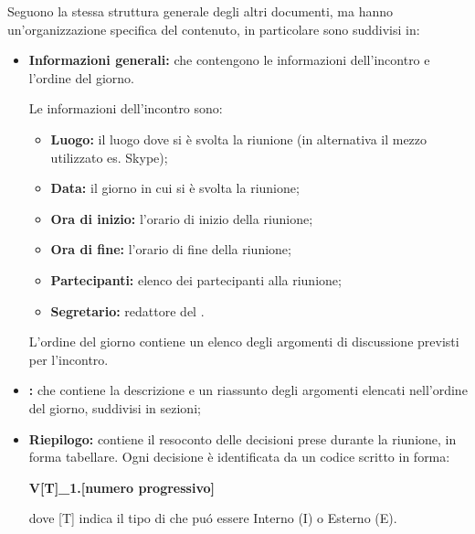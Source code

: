         Seguono la stessa struttura generale degli altri documenti, ma hanno un'organizzazione specifica del contenuto, in particolare sono suddivisi in:
        \begin{itemize}
          \item \textbf{Informazioni generali:} che contengono le informazioni dell'incontro e l'ordine del giorno.

             Le informazioni dell'incontro sono:
               \begin{itemize}
                 \item \textbf{Luogo:} il luogo dove si è svolta la riunione (in alternativa il mezzo utilizzato es. Skype);
                 \item \textbf{Data:} il giorno in cui si è svolta la riunione;
                 \item \textbf{Ora di inizio:} l'orario di inizio della riunione;
                 \item \textbf{Ora di fine:} l'orario di fine della riunione;
                 \item \textbf{Partecipanti:} elenco dei partecipanti alla riunione;
                 \item \textbf{Segretario:} redattore del \Verbale{}.
               \end{itemize}
			L'ordine del giorno contiene un elenco degli argomenti di discussione previsti per l'incontro.
          \item \textbf{\Verbale{}}\textbf{:} che contiene la descrizione e un riassunto degli argomenti elencati nell'ordine del giorno, suddivisi in sezioni;
          \item \textbf{Riepilogo:} contiene il resoconto delle decisioni prese durante la riunione, in forma tabellare. Ogni decisione è identificata da un codice scritto in forma:
          \begin{center}
            \textbf{V[T]\_1.[numero progressivo]}
          \end{center}
          dove [T] indica il tipo di \Verbale{} che puó essere Interno (I) o Esterno (E).
        \end{itemize}

